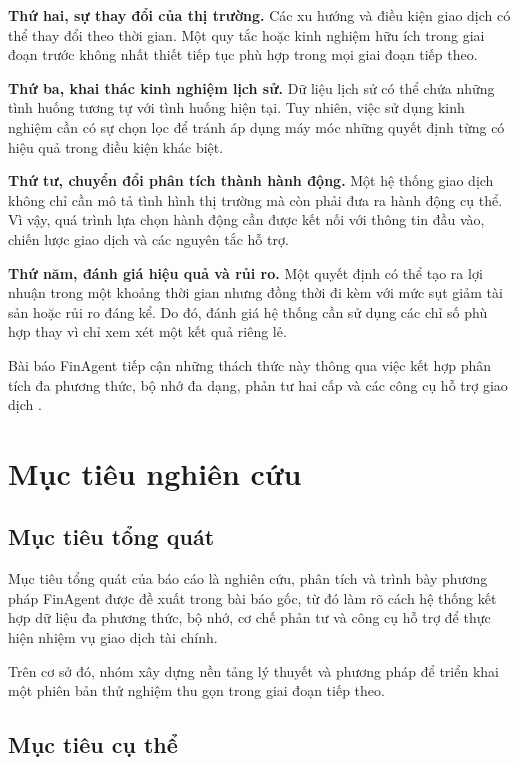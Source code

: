 \textbf{Thứ hai, sự thay đổi của thị trường.} Các xu hướng và điều kiện giao dịch có thể thay đổi theo thời gian. Một quy tắc hoặc kinh nghiệm hữu ích trong giai đoạn trước không nhất thiết tiếp tục phù hợp trong mọi giai đoạn tiếp theo.

\textbf{Thứ ba, khai thác kinh nghiệm lịch sử.} Dữ liệu lịch sử có thể chứa những tình huống tương tự với tình huống hiện tại. Tuy nhiên, việc sử dụng kinh nghiệm cần có sự chọn lọc để tránh áp dụng máy móc những quyết định từng có hiệu quả trong điều kiện khác biệt.

\textbf{Thứ tư, chuyển đổi phân tích thành hành động.} Một hệ thống giao dịch không chỉ cần mô tả tình hình thị trường mà còn phải đưa ra hành động cụ thể. Vì vậy, quá trình lựa chọn hành động cần được kết nối với thông tin đầu vào, chiến lược giao dịch và các nguyên tắc hỗ trợ.

\textbf{Thứ năm, đánh giá hiệu quả và rủi ro.} Một quyết định có thể tạo ra lợi nhuận trong một khoảng thời gian nhưng đồng thời đi kèm với mức sụt giảm tài sản hoặc rủi ro đáng kể. Do đó, đánh giá hệ thống cần sử dụng các chỉ số phù hợp thay vì chỉ xem xét một kết quả riêng lẻ.

Bài báo FinAgent tiếp cận những thách thức này thông qua việc kết hợp phân tích đa phương thức, bộ nhớ đa dạng, phản tư hai cấp và các công cụ hỗ trợ giao dịch \cite{zhang2024finagent}.

\section{Mục tiêu nghiên cứu}

\subsection{Mục tiêu tổng quát}

Mục tiêu tổng quát của báo cáo là nghiên cứu, phân tích và trình bày phương pháp FinAgent được đề xuất trong bài báo gốc, từ đó làm rõ cách hệ thống kết hợp dữ liệu đa phương thức, bộ nhớ, cơ chế phản tư và công cụ hỗ trợ để thực hiện nhiệm vụ giao dịch tài chính.

Trên cơ sở đó, nhóm xây dựng nền tảng lý thuyết và phương pháp để triển khai một phiên bản thử nghiệm thu gọn trong giai đoạn tiếp theo.

\subsection{Mục tiêu cụ thể}

